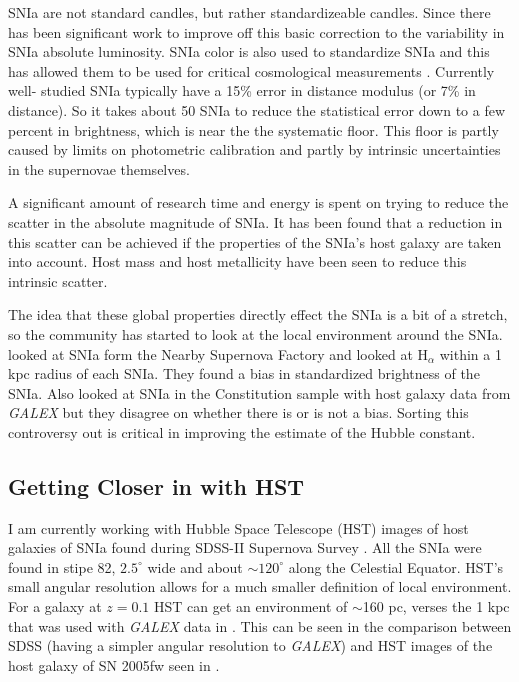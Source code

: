 \documentclass[apj, iop]{emulateapj}
\newcommand{\sn}{SNIa}
\newcommand{\todo}[1]{\textbf{\textcolor{red}{#1}}}
\newcommand{\Hubble}{\ensuremath{\text{H}_0}}
\begin{document}
\sn{} are not standard candles, but rather standardizeable candles. Since
\cite{Phillips93} there has been significant work to improve off this basic
correction to the variability in \sn{} absolute luminosity. \sn{} color is also
used to standardize \sn{} and this has allowed them to be used for critical
cosmological measurements \citep{Riess98, Perlmutter99}. Currently well-
studied \sn{} typically have a 15\% error in distance modulus (or 7\% in
distance). So it takes about 50 \sn{} to reduce the statistical error down to a
few percent in brightness, which is near the the systematic floor. This floor
is partly caused by limits on photometric calibration and partly by intrinsic
uncertainties in the supernovae themselves.

A significant amount of research time and energy is spent on trying to reduce
the scatter in the absolute magnitude of \sn{}. It has been found that a
reduction in this scatter can be achieved if the properties of the \sn{}'s host
galaxy are taken into account. Host mass \citep{Childress13} and host
metallicity \citep{Hayden13} have been seen to reduce this intrinsic scatter.

The idea that these global properties directly effect the \sn{} is a bit of a
stretch, so the community has started to look at the local environment around
the \sn{}. \cite{Rigault13} looked at \sn{} form the Nearby Supernova Factory
and looked at H$_{\alpha}$ within a 1 kpc radius of each \sn{}. They found a
bias in standardized brightness of the \sn{}. Also \cite{Rigault15, Jones15}
looked at \sn{} in the Constitution sample with host galaxy data from {\it
GALEX} but they disagree on whether there is or is not a bias. %
Sorting this controversy out is
critical in improving the estimate of the Hubble constant.

\subsection{Getting Closer in with HST}\label{hst}

I am currently working with Hubble Space Telescope (HST) images of host galaxies
of \sn{} found during SDSS-II Supernova Survey
\citep{2008AJ....135..338F,2008AJ....135..348S}. All the \sn{} were found in
stipe 82, $2.5^{\circ}$ wide and about $\sim120^{\circ}$ along the Celestial
Equator. HST's small angular resolution allows for a much smaller definition of
local environment. For a galaxy at $z = 0.1$ HST can get an environment of
$\sim$160 pc, verses the 1 kpc that was used with {\it GALEX} data in
\cite{Jones15,Rigault15}. This can be seen in the comparison between SDSS
(having a simpler angular resolution to {\it GALEX}) and HST images of the host
galaxy of SN 2005fw seen in .
\end{document}
